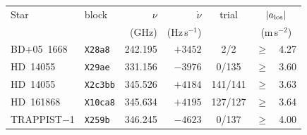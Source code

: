 \begin{tabular}{@{}llr@{~}r@{~}c@{~}r@{~}l@{}}
\hline
Star & block & $\nu$ & $\dot\nu$ & trial & \multicolumn{2}{c}{$|a_{\rm los}|$} \\
 & & (GHz) & (Hz\,s$^{-1}$) & & \multicolumn{2}{c}{(m\,s$^{-2}$)} \\
\hline
BD+05~1668 & \texttt{X28a8} & 242.195 & $+3452$ & 2/2 & $\ge$ & 4.27 \\
HD~14055 & \texttt{X29ae} & 331.156 & $-3976$ & 0/135 & $\ge$ & 3.60 \\
HD~14055 & \texttt{X2c3bb} & 345.526 & $+4184$ & 141/141 & $\ge$ & 3.63 \\
HD~161868 & \texttt{X10ca8} & 345.634 & $+4195$ & 127/127 & $\ge$ & 3.64 \\
TRAPPIST$-$1 & \texttt{X259b} & 346.245 & $-4623$ & 0/137 & $\ge$ & 4.00 \\
\hline
\end{tabular}
